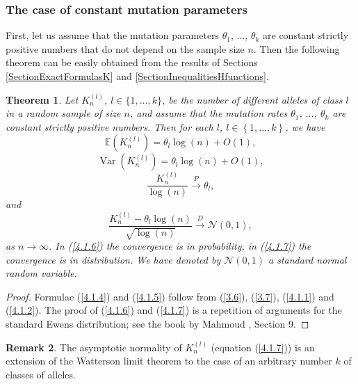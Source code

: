 \documentclass[12pt]{amsart}
\newtheorem{thm}{Theorem}[section]
\theoremstyle{definition}
\newtheorem{rem}[thm]{Remark}
\numberwithin{equation}{section}
\DeclareMathOperator{\Var}{Var}
\begin{document}
\subsubsection{The case of constant mutation parameters}
First, let us assume that the mutation parameters
$\theta_1$, $\ldots$, $\theta_k$ are constant strictly positive numbers that do not depend on the sample size $n$. Then the following theorem
can be easily obtained from the results of Sections \ref{SectionExactFormulasK} and \ref{SectionInequalitiesHfunctions}.
\begin{thm}\label{TheoremKconstant}Let $K_n^{(l)}$, $l\in\{1,\ldots,k\}$, be the number of different alleles of class $l$ in a random sample of size $n$, and assume that the mutation rates $\theta_1$, $\ldots$, $\theta_k$ are constant strictly positive numbers. Then
for each $l$, $l\in\left\{1,\ldots,k\right\}$,
we have
\begin{equation}\label{4.1.4}
\mathbb{E}\left(K_n^{(l)}\right)=\theta_l\log(n)+O(1),
\end{equation}
\begin{equation}\label{4.1.5}
\Var\left(K_n^{(l)}\right)=\theta_l\log(n)+O(1),
\end{equation}
\begin{equation}\label{4.1.6}
\frac{K_n^{(l)}}{\log(n)}\overset{P}{\longrightarrow}\theta_l,
\end{equation}
and
\begin{equation}\label{4.1.7}
\frac{K_n^{(l)}-\theta_l\log(n)}{\sqrt{\log(n)}}\overset{D}{\longrightarrow}\mathcal{N}(0,1),
\end{equation}
as $n\rightarrow\infty$. In (\ref{4.1.6}) the convergence is in probability, in (\ref{4.1.7}) the convergence is in distribution.
We have denoted by $\mathcal{N}(0,1)$ a standard normal random variable.
\end{thm}
\begin{proof} Formulae (\ref{4.1.4}) and (\ref{4.1.5}) follow from
(\ref{3.6}), (\ref{3.7}), (\ref{4.1.1}) and (\ref{4.1.2}). The proof of (\ref{4.1.6})
and (\ref{4.1.7}) is a repetition of arguments for the standard Ewens distribution; see the book by Mahmoud \cite{Mahmoud}, Section 9.
\end{proof}
\begin{rem}The asymptotic normality of $K_n^{(l)}$ (equation (\ref{4.1.7}))
is an extension of the Watterson limit theorem \cite{Watterson} to the case
of an arbitrary number $k$ of classes of alleles.
\end{rem}
\end{document}
